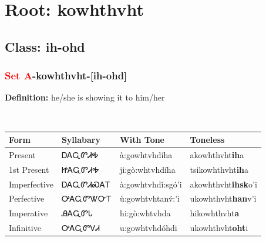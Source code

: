 \needspace{4in}
\section*{Root: kowhthvht}
\nopagebreak
{}
\needspace{3in}
\subsection*{Class: ih-ohd}
\nopagebreak
\needspace{2in}
\subsubsection*{\textcolor{Red}{Set A}{-}\textbf{kowhthvht}{-}[ih-ohd]}
\nopagebreak
\textbf{Definition: } he/she is showing it to him/her
\\[0.5em]
\begin{tabularx}{\textwidth}{l X X X}%
\toprule%
\textbf{Form}&\textbf{Syllabary}&\textbf{With Tone}&\textbf{Toneless}\\%
\midrule%
Present&ᎠᎪᏩᏛᏗᎭ&à:gowhtvhdíha&akowhthvht\textbf{ih}a\\%
1st Present&ᏥᎪᏩᏛᏗᎭ&ji:gò:whtvhdíha&tsikowhthvht\textbf{ih}a\\%
Imperfective&ᎠᎪᏩᏛᏗᏍᎪᎢ&à:gowhtvhdǐ:sgó’i&akowhthvht\textbf{ihsk}o'i\\%
Perfective&ᎤᎪᏩᏛᏔᏅᎢ&ù:gowhtvhtanv́:’i&ukowhthvht\textbf{han}v'i\\%
Imperative&ᎯᎪᏩᏛᏓ&hi:gò:whtvhda&hikowhthvht\textbf{a}\\%
Infinitive&ᎤᎪᏩᏛᏙᏗ&u:gowhtvhdóhdi&ukowhthvht\textbf{oht}i\\%
\bottomrule%
\end{tabularx}
\\[1em]